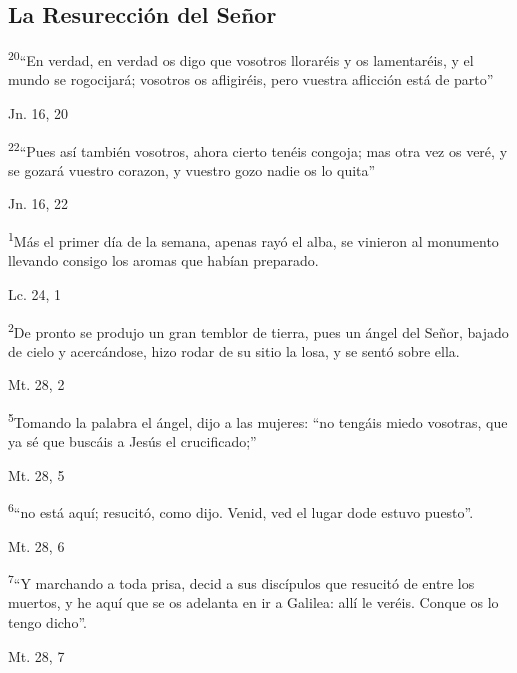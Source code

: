 \documentclass[a4paper,11pt]{article}
\begin{document}
    \subsection*{\hfil La Resurección del Señor \hfil}
      \textsuperscript{20}``En verdad, en verdad os digo que vosotros lloraréis y os lamentaréis, y el mundo se rogocijará;
      vosotros os afligiréis, pero vuestra aflicción está de parto'' 
      \begin{flushright}
        Jn. 16, 20        
      \end{flushright}      
      \textsuperscript{22}``Pues así también vosotros, ahora cierto tenéis congoja; mas otra vez os veré, y se gozará vuestro corazon,
      y vuestro gozo nadie os lo quita''
      \begin{flushright}
        Jn. 16, 22       
      \end{flushright}      
      \textsuperscript{1}Más el primer día de la semana, apenas rayó el alba, se vinieron al monumento llevando consigo los aromas
      que habían preparado.
      \begin{flushright}
        Lc. 24, 1        
      \end{flushright}      
      \textsuperscript{2}De pronto se produjo un gran temblor de tierra, pues un ángel del Señor, bajado de cielo y acercándose, hizo rodar
      de su sitio la losa, y se sentó sobre ella.
      \begin{flushright}
        Mt. 28, 2        
      \end{flushright}      
      \textsuperscript{5}Tomando la palabra el ángel, dijo a las mujeres: ``no tengáis miedo vosotras, que ya sé que buscáis a Jesús el crucificado;''
      \begin{flushright}
        Mt. 28, 5        
      \end{flushright}      
      \textsuperscript{6}``no está aquí; resucitó, como dijo. Venid, ved el lugar dode estuvo puesto''.
      \begin{flushright}
        Mt. 28, 6       
      \end{flushright}      
      \textsuperscript{7}``Y marchando a toda prisa, decid a sus discípulos que resucitó de entre los muertos, y he aquí que se os adelanta en ir a Galilea:
      allí le veréis. Conque os lo tengo dicho''.
      \begin{flushright}
        Mt. 28, 7     
      \end{flushright}      
\end{document}
